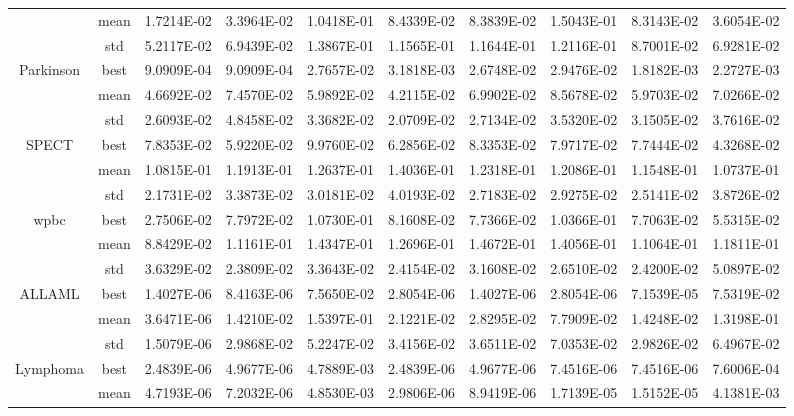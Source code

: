 \documentclass{wzuthesis}
\begin{document}
\begin{table}[htbp]
\begin{tabular}{cccccccccc}
          & mean  & 1.7214E-02 & 3.3964E-02 & 1.0418E-01 & 8.4339E-02 & 8.3839E-02 & 1.5043E-01 & 8.3143E-02 & 3.6054E-02 \\
          & std   & 5.2117E-02 & 6.9439E-02 & 1.3867E-01 & 1.1565E-01 & 1.1644E-01 & 1.2116E-01 & 8.7001E-02 & 6.9281E-02 \\
    \multirow{3}[0]{*}{Parkinson} & best  & 9.0909E-04 & 9.0909E-04 & 2.7657E-02 & 3.1818E-03 & 2.6748E-02 & 2.9476E-02 & 1.8182E-03 & 2.2727E-03 \\
          & mean  & 4.6692E-02 & 7.4570E-02 & 5.9892E-02 & 4.2115E-02 & 6.9902E-02 & 8.5678E-02 & 5.9703E-02 & 7.0266E-02 \\
          & std   & 2.6093E-02 & 4.8458E-02 & 3.3682E-02 & 2.0709E-02 & 2.7134E-02 & 3.5320E-02 & 3.1505E-02 & 3.7616E-02 \\
    \multirow{3}[0]{*}{SPECT} & best  & 7.8353E-02 & 5.9220E-02 & 9.9760E-02 & 6.2856E-02 & 8.3353E-02 & 7.9717E-02 & 7.7444E-02 & 4.3268E-02 \\
          & mean  & 1.0815E-01 & 1.1913E-01 & 1.2637E-01 & 1.4036E-01 & 1.2318E-01 & 1.2086E-01 & 1.1548E-01 & 1.0737E-01 \\
          & std   & 2.1731E-02 & 3.3873E-02 & 3.0181E-02 & 4.0193E-02 & 2.7183E-02 & 2.9275E-02 & 2.5141E-02 & 3.8726E-02 \\
    \multirow{3}[0]{*}{wpbc} & best  & 2.7506E-02 & 7.7972E-02 & 1.0730E-01 & 8.1608E-02 & 7.7366E-02 & 1.0366E-01 & 7.7063E-02 & 5.5315E-02 \\
          & mean  & 8.8429E-02 & 1.1161E-01 & 1.4347E-01 & 1.2696E-01 & 1.4672E-01 & 1.4056E-01 & 1.1064E-01 & 1.1811E-01 \\
          & std   & 3.6329E-02 & 2.3809E-02 & 3.3643E-02 & 2.4154E-02 & 3.1608E-02 & 2.6510E-02 & 2.4200E-02 & 5.0897E-02 \\
    \multirow{3}[0]{*}{ALLAML} & best  & 1.4027E-06 & 8.4163E-06 & 7.5650E-02 & 2.8054E-06 & 1.4027E-06 & 2.8054E-06 & 7.1539E-05 & 7.5319E-02 \\
          & mean  & 3.6471E-06 & 1.4210E-02 & 1.5397E-01 & 2.1221E-02 & 2.8295E-02 & 7.7909E-02 & 1.4248E-02 & 1.3198E-01 \\
          & std   & 1.5079E-06 & 2.9868E-02 & 5.2247E-02 & 3.4156E-02 & 3.6511E-02 & 7.0353E-02 & 2.9826E-02 & 6.4967E-02 \\
    \multirow{3}[0]{*}{Lymphoma} & best  & 2.4839E-06 & 4.9677E-06 & 4.7889E-03 & 2.4839E-06 & 4.9677E-06 & 7.4516E-06 & 7.4516E-06 & 7.6006E-04 \\
          & mean  & 4.7193E-06 & 7.2032E-06 & 4.8530E-03 & 2.9806E-06 & 8.9419E-06 & 1.7139E-05 & 1.5152E-05 & 4.1381E-03 \\

\end{tabular}
\end{table}
\end{document}
